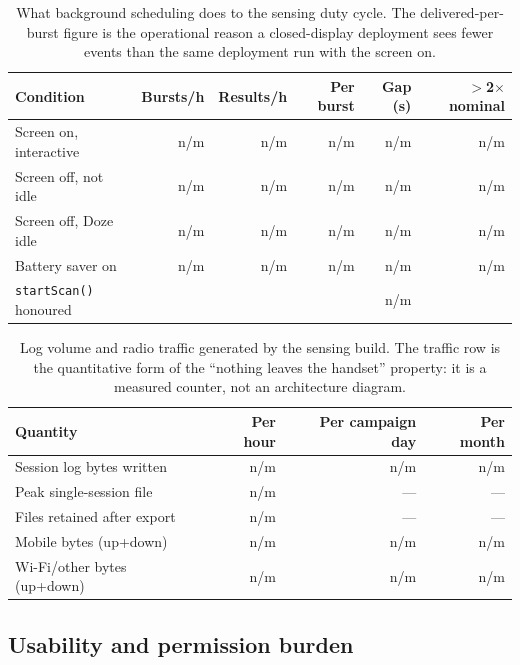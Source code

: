 \begin{table}[t]
\centering
\caption{What background scheduling does to the sensing duty cycle. The delivered-per-burst figure
is the operational reason a closed-display deployment sees fewer events than the same deployment
run with the screen on.}
\label{tab:cadence}
\small
\begin{tabular}{lrrrrr}
\toprule
Condition & Bursts/h & Results/h & Per burst & Gap (s) & $>$2$\times$ nominal \\
\midrule
Screen on, interactive   & n/m & n/m & n/m & n/m & n/m \\
Screen off, not idle     & n/m & n/m & n/m & n/m & n/m \\
Screen off, Doze idle    & n/m & n/m & n/m & n/m & n/m \\
Battery saver on         & n/m & n/m & n/m & n/m & n/m \\
\texttt{startScan()} honoured & \multicolumn{4}{r}{n/m} \\
\bottomrule
\end{tabular}
\end{table}

\begin{table}[t]
\centering
\caption{Log volume and radio traffic generated by the sensing build. The traffic row is the
quantitative form of the ``nothing leaves the handset'' property: it is a measured counter, not an
architecture diagram.}
\label{tab:storage}
\small
\begin{tabular}{lrrr}
\toprule
Quantity & Per hour & Per campaign day & Per month \\
\midrule
Session log bytes written        & n/m & n/m & n/m \\
Peak single-session file         & n/m & ---   & ---   \\
Files retained after export      & n/m & ---   & ---   \\
Mobile bytes (up+down)           & n/m & n/m & n/m \\
Wi-Fi/other bytes (up+down)      & n/m & n/m & n/m \\
\bottomrule
\end{tabular}
\end{table}

\subsection{Usability and permission burden}

